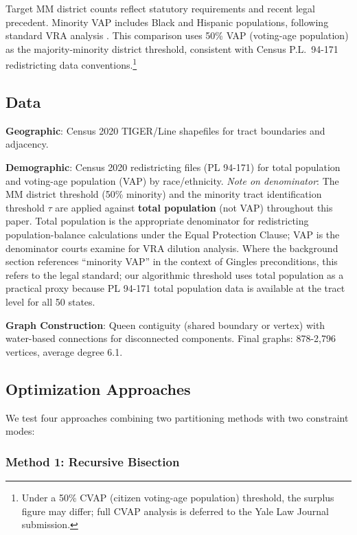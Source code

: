 Target MM district counts reflect statutory requirements and recent legal precedent. Minority VAP includes Black and Hispanic populations, following standard VRA analysis \citep{katz2020}. This comparison uses 50\% VAP (voting-age population) as the majority-minority district threshold, consistent with Census P.L.~94-171 redistricting data conventions.\footnote{Under a 50\% CVAP (citizen voting-age population) threshold, the surplus figure may differ; full CVAP analysis is deferred to the Yale Law Journal submission.}

\subsection{Data}

\textbf{Geographic}: Census 2020 TIGER/Line shapefiles for tract boundaries and adjacency.

\textbf{Demographic}: Census 2020 redistricting files (PL 94-171) for total population and voting-age population (VAP) by race/ethnicity. \emph{Note on denominator}: The MM district threshold (50\% minority) and the minority tract identification threshold $\tau$ are applied against \textbf{total population} (not VAP) throughout this paper. Total population is the appropriate denominator for redistricting population-balance calculations under the Equal Protection Clause; VAP is the denominator courts examine for VRA dilution analysis. Where the background section references ``minority VAP'' in the context of Gingles preconditions, this refers to the legal standard; our algorithmic threshold uses total population as a practical proxy because PL 94-171 total population data is available at the tract level for all 50 states.

\textbf{Graph Construction}: Queen contiguity (shared boundary or vertex) with water-based connections for disconnected components. Final graphs: 878-2,796 vertices, average degree 6.1.

\subsection{Optimization Approaches}

We test four approaches combining two partitioning methods with two constraint modes:

\subsubsection{Method 1: Recursive Bisection}


